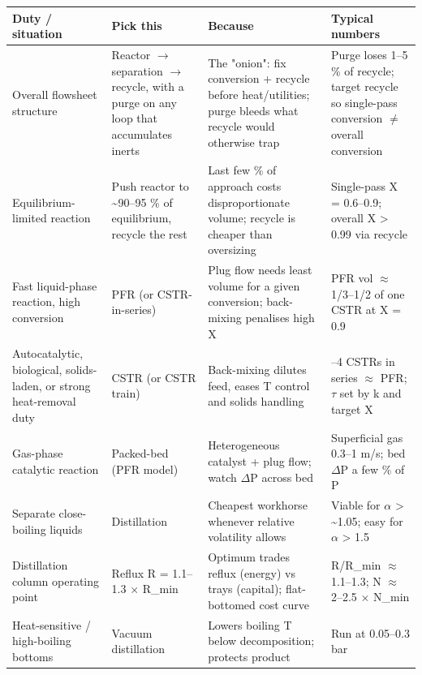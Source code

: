 \documentclass[11pt,a4paper]{article}
\begin{document}
\begin{longtable}[]{@{}>{\raggedright\arraybackslash}p{\dimexpr(\linewidth-8\tabcolsep)/4\relax}>{\raggedright\arraybackslash}p{\dimexpr(\linewidth-8\tabcolsep)/4\relax}>{\raggedright\arraybackslash}p{\dimexpr(\linewidth-8\tabcolsep)/4\relax}>{\raggedright\arraybackslash}p{\dimexpr(\linewidth-8\tabcolsep)/4\relax}@{}}
\toprule\noalign{}
Duty / situation & Pick this & Because & Typical numbers \\
\midrule\noalign{}
\endhead
\bottomrule\noalign{}
\endlastfoot
Overall flowsheet structure & Reactor \(\rightarrow\) separation \(\rightarrow\) recycle, with a
purge on any loop that accumulates inerts & The "onion": fix conversion
+ recycle before heat/utilities; purge bleeds what recycle would
otherwise trap & Purge loses 1--5 \% of recycle; target recycle so
single-pass conversion \(\neq\) overall conversion \\
Equilibrium-limited reaction & Push reactor to \textasciitilde90--95 \%
of equilibrium, recycle the rest & Last few \% of approach costs
disproportionate volume; recycle is cheaper than oversizing &
Single-pass X = 0.6--0.9; overall X \textgreater{} 0.99 via recycle \\
Fast liquid-phase reaction, high conversion & PFR (or CSTR-in-series) &
Plug flow needs least volume for a given conversion; back-mixing
penalises high X & PFR vol \(\approx\) 1/3--1/2 of one CSTR at X = 0.9 \\
Autocatalytic, biological, solids-laden, or strong heat-removal duty &
CSTR (or CSTR train) & Back-mixing dilutes feed, eases T control and
solids handling & 3--4 CSTRs in series \(\approx\) PFR; \(\tau\) set by k and target X \\
Gas-phase catalytic reaction & Packed-bed (PFR model) & Heterogeneous
catalyst + plug flow; watch \(\Delta\)P across bed & Superficial gas 0.3--1 m/s;
bed \(\Delta\)P a few \% of P \\
Separate close-boiling liquids & Distillation & Cheapest workhorse
whenever relative volatility allows & Viable for \(\alpha\) \textgreater{}
\textasciitilde1.05; easy for \(\alpha\) \textgreater{} 1.5 \\
Distillation column operating point & Reflux R = 1.1--1.3 \(\times\) R\_min &
Optimum trades reflux (energy) vs trays (capital); flat-bottomed cost
curve & R/R\_min \(\approx\) 1.1--1.3; N \(\approx\) 2--2.5 \(\times\) N\_min \\
Heat-sensitive / high-boiling bottoms & Vacuum distillation & Lowers
boiling T below decomposition; protects product & Run at 0.05--0.3 bar

\end{longtable}
\end{document}
